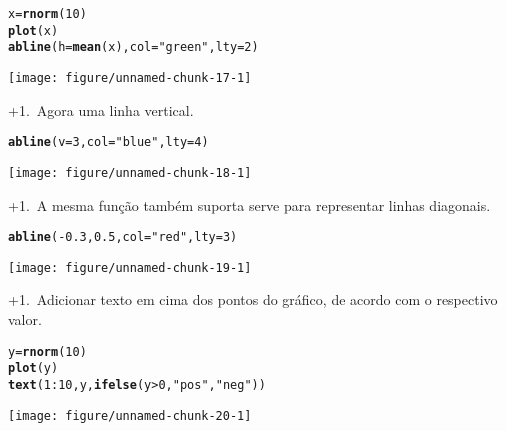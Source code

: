 \documentclass{article}\usepackage[]{graphicx}\usepackage[]{color}
\makeatletter
\def\maxwidth{ %
  \ifdim\Gin@nat@width>\linewidth
    \linewidth
  \else
    \Gin@nat@width
  \fi
}
\newcommand{\hlnum}[1]{\textcolor[rgb]{0.686,0.059,0.569}{#1}}%
\newcommand{\hlstr}[1]{\textcolor[rgb]{0.192,0.494,0.8}{#1}}%
\newcommand{\hlopt}[1]{\textcolor[rgb]{0,0,0}{#1}}%
\newcommand{\hlstd}[1]{\textcolor[rgb]{0.345,0.345,0.345}{#1}}%
\newcommand{\hlkwb}[1]{\textcolor[rgb]{0.69,0.353,0.396}{#1}}%
\newcommand{\hlkwc}[1]{\textcolor[rgb]{0.333,0.667,0.333}{#1}}%
\newcommand{\hlkwd}[1]{\textcolor[rgb]{0.737,0.353,0.396}{\textbf{#1}}}%
\newenvironment{kframe}{%
 \def\at@end@of@kframe{}%
 \ifinner\ifhmode%
  \def\at@end@of@kframe{\end{minipage}}%
  \begin{minipage}{\columnwidth}%
 \fi\fi%
 \def\FrameCommand##1{\hskip\@totalleftmargin \hskip-\fboxsep
 \colorbox{shadecolor}{##1}\hskip-\fboxsep
     \hskip-\linewidth \hskip-\@totalleftmargin \hskip\columnwidth}%
 \MakeFramed {\advance\hsize-\width
   \@totalleftmargin\z@ \linewidth\hsize
   \@setminipage}}%
 {\par\unskip\endMakeFramed%
 \at@end@of@kframe}
\newenvironment{knitrout}{}{} %
\newcounter{graph}[section]
\renewcommand{\thegraph}{\number\numexpr\value{graph}+1\relax.~\stepcounter{graph}}
\makeatother
\begin{document}
\begin{knitrout}
\color{fgcolor}\begin{kframe}
\begin{alltt}
\hlstd{x} \hlkwb{=} \hlkwd{rnorm}\hlstd{(}\hlnum{10}\hlstd{)}
\hlkwd{plot}\hlstd{(x)}
\hlkwd{abline}\hlstd{(}\hlkwc{h} \hlstd{=} \hlkwd{mean}\hlstd{(x),} \hlkwc{col} \hlstd{=} \hlstr{"green"}\hlstd{,} \hlkwc{lty} \hlstd{=} \hlnum{2}\hlstd{)}
\end{alltt}
\end{kframe}
\texttt{[image: figure/unnamed-chunk-17-1]} 

\end{knitrout}
\pagebreak
\thegraph Agora uma linha vertical.
\begin{knitrout}
\color{fgcolor}\begin{kframe}
\begin{alltt}
\hlkwd{abline}\hlstd{(}\hlkwc{v} \hlstd{=} \hlnum{3}\hlstd{,} \hlkwc{col} \hlstd{=} \hlstr{"blue"}\hlstd{,} \hlkwc{lty} \hlstd{=} \hlnum{4}\hlstd{)}
\end{alltt}
\end{kframe}
\texttt{[image: figure/unnamed-chunk-18-1]} 

\end{knitrout}
\pagebreak
\thegraph A mesma função também suporta serve para representar linhas diagonais.
\begin{knitrout}
\color{fgcolor}\begin{kframe}
\begin{alltt}
\hlkwd{abline}\hlstd{(}\hlopt{-}\hlnum{0.3}\hlstd{,} \hlnum{0.5}\hlstd{,} \hlkwc{col} \hlstd{=} \hlstr{"red"}\hlstd{,} \hlkwc{lty} \hlstd{=} \hlnum{3}\hlstd{)}
\end{alltt}
\end{kframe}
\texttt{[image: figure/unnamed-chunk-19-1]} 

\end{knitrout}
\pagebreak
\thegraph Adicionar texto em cima dos pontos do gráfico, de acordo com o respectivo valor.
\begin{knitrout}
\color{fgcolor}\begin{kframe}
\begin{alltt}
\hlstd{y} \hlkwb{=} \hlkwd{rnorm}\hlstd{(}\hlnum{10}\hlstd{)}
\hlkwd{plot}\hlstd{(y)}
\hlkwd{text}\hlstd{(}\hlnum{1}\hlopt{:}\hlnum{10}\hlstd{, y,} \hlkwd{ifelse}\hlstd{(y} \hlopt{>} \hlnum{0}\hlstd{,} \hlstr{"pos"}\hlstd{,} \hlstr{"neg"}\hlstd{))}
\end{alltt}
\end{kframe}
\texttt{[image: figure/unnamed-chunk-20-1]} 

\end{knitrout}
\end{document}
